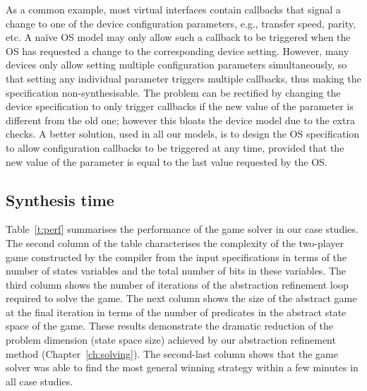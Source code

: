 As a common example, most virtual interfaces contain callbacks that signal a change to one of the device configuration parameters, e.g., transfer speed, parity, etc.  A na\"ive OS model may only allow such a callback to be triggered when the OS has requested a change to the corresponding device setting.  However, many devices only allow setting multiple configuration parameters simultaneously, so that setting any individual parameter triggers multiple callbacks, thus making the specification non-synthesisable.  The problem can be rectified by changing the device specification to only trigger callbacks if the new value of the parameter is different from the old one; however this bloats the device model due to the extra checks.  A better solution, used in all our models, is to design the OS specification to allow configuration callbacks to be triggered at any time, provided that the new value of the parameter is equal to the last value requested by the OS. 

\subsection{Synthesis time} 
Table~\ref{t:perf} summarises the performance of the \termite game solver in our case studies.  The second column of the table characterises the complexity of the two-player game constructed by the \tsl compiler from the input specifications in terms of the number of states variables and the total number of bits in these variables.  The third column shows the number of iterations of the abstraction refinement loop required to solve the game.  The next column shows the size of the abstract game at the final iteration in terms of the number of predicates in the abstract state space of the game.  These results demonstrate the dramatic reduction of the problem dimension (state space size) achieved by our abstraction refinement method (Chapter~\ref{ch:solving}).  The second-last column shows that the \termite game solver was able to find the most general winning strategy within a few minutes in all case studies.

